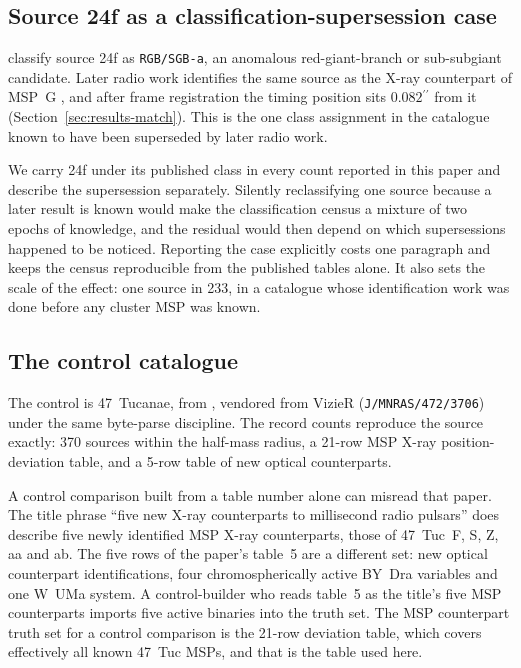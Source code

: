 \documentclass[11pt]{article}
\newcommand{\as}{\ensuremath{^{\prime\prime}}}
\begin{document}
\subsection{Source 24f as a classification-supersession case}
\label{sec:data-24f}

\citet{Henleywillis2018} classify source 24f as \texttt{RGB/SGB-a}, an anomalous red-giant-branch or sub-subgiant candidate. Later radio work identifies the same source as the X-ray counterpart of MSP~G \citep{ZhaoHeinke2023,ColomiBernadich2026}, and after frame registration the timing position sits $0.082\as$ from it (Section~\ref{sec:results-match}). This is the one class assignment in the catalogue known to have been superseded by later radio work.

We carry 24f under its published class in every count reported in this paper and describe the supersession separately. Silently reclassifying one source because a later result is known would make the classification census a mixture of two epochs of knowledge, and the residual would then depend on which supersessions happened to be noticed. Reporting the case explicitly costs one paragraph and keeps the census reproducible from the published tables alone. It also sets the scale of the effect: one source in 233, in a catalogue whose identification work was done before any cluster MSP was known.

\subsection{The control catalogue}
\label{sec:data-control}

The control is 47~Tucanae, from \citet{Bhattacharya2017}, vendored from VizieR (\texttt{J/MNRAS/472/3706}) under the same byte-parse discipline. The record counts reproduce the source exactly: 370 sources within the half-mass radius, a 21-row MSP X-ray position-deviation table, and a 5-row table of new optical counterparts.

A control comparison built from a table number alone can misread that paper. The title phrase ``five new X-ray counterparts to millisecond radio pulsars'' does describe five newly identified MSP X-ray counterparts, those of 47~Tuc~F, S, Z, aa and ab. The five rows of the paper's table~5 are a different set: new optical counterpart identifications, four chromospherically active BY~Dra variables and one W~UMa system. A control-builder who reads table~5 as the title's five MSP counterparts imports five active binaries into the truth set. The MSP counterpart truth set for a control comparison is the 21-row deviation table, which covers effectively all known 47~Tuc MSPs, and that is the table used here.
\end{document}
